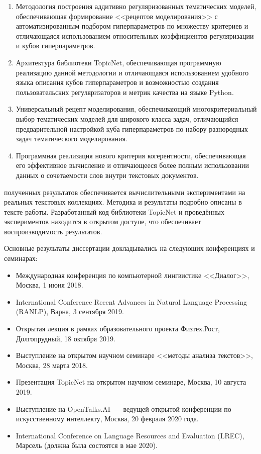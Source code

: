 {}
\begin{enumerate}[beginpenalty=10000] %
\item 
    Методология построения аддитивно регуляризованных тематических моделей, обеспечивающая формирование <<рецептов моделирования>> с автоматизированным подбором гиперпараметров по множеству критериев и отличающаяся использованием относительных коэффициентов регуляризации и кубов гиперпараметров. 
\item 
    Архитектура библиотеки TopicNet, обеспечивающая программную реализацию данной методологии и отличающаяся использованием удобного языка описания кубов гиперпараметров и возможностью создания пользовательских регуляризаторов и метрик качества на языке Python.
\item 
    Универсальный рецепт моделирования, обеспечивающий многокритериальный выбор тематических моделей для широкого класса задач, отличающийся предварительной настройкой куба гиперпараметров по набору разнородных задач тематического моделирования.    
\item 
    Программная реализация нового критерия когерентности, обеспечивающая его эффективное вычисление и отличающееся более полным использовании данных о сочетаемости слов внутри текстовых документов.
\end{enumerate}

{\reliability} полученных результатов обеспечивается вычислительными экспериментами на реальных текстовых коллекциях. Методика и результаты подробно описаны в тексте работы. Разработанный код библиотеки TopicNet и проведённых экспериментов находится в открытом доступе, что обеспечивает воспроизводимость результатов.  

{\probation}
Основные результаты диссертации докладывались на следующих конференциях и семинарах:
\begin{itemize}
    \item Международная конференция по компьютерной лингвистике <<Диалог>>, Москва, 1 июня 2018.
    \item International Conference Recent Advances in Natural Language Processing (RANLP), Варна, 3 сентября 2019.
    \item Открытая лекция в рамках образовательного проекта Физтех.Рост, Долгопрудный, 18 октября 2019.
    \item Выступление на открытом научном семинаре <<методы анализа текстов>>, Москва, 28 марта 2018.
    \item Презентация TopicNet на открытом научном семинаре, Москва, 10 августа 2019.
    \item Выступление на OpenTalks.AI~--- ведущей открытой конференции по искусственному интеллекту, Москва, 20 февраля 2020 года.
    \item International Conference on Language Resources and Evaluation (LREC), Марсель (должна была состоятся в мае 2020).
\end{itemize}

